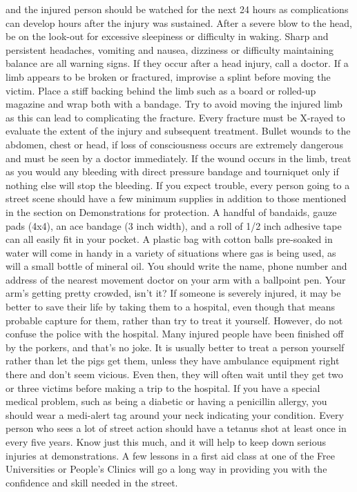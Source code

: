 \documentclass[11pt,twoside,a4paper]{book}
\begin{document}
and the injured person should be watched for the next 24 hours as complications can develop hours after the injury was sustained. After a severe blow to the head, be on the look-out for excessive sleepiness or difficulty in waking. Sharp and persistent headaches, vomiting and nausea, dizziness or difficulty maintaining balance are all warning signs. If they occur after a head injury, call a doctor. If a limb appears to be broken or fractured, improvise a splint before moving the victim. Place a stiff backing behind the limb such as a board or rolled-up magazine and wrap both with a bandage. Try to avoid moving the injured limb as this can lead to complicating the fracture. Every fracture must be X-rayed to evaluate the extent of the injury and subsequent treatment. Bullet wounds to the abdomen, chest or head, if loss of consciousness occurs are extremely dangerous and must be seen by a doctor immediately. If the wound occurs in the limb, treat as you would any bleeding with direct pressure bandage and tourniquet only if nothing else will stop the bleeding. If you expect trouble, every person going to a street scene should have a few minimum supplies in addition to those mentioned in the section on Demonstrations for protection. A handful of bandaids, gauze pads (4x4), an ace bandage (3 inch width), and a roll of 1/2 inch adhesive tape can all easily fit in your pocket. A plastic bag with cotton balls pre-soaked in water will come in handy in a variety of situations where gas is being used, as will a small bottle of mineral oil. You should write the name, phone number and address of the nearest movement doctor on your arm with a ballpoint pen. Your arm's getting pretty crowded, isn't it? If someone is severely injured, it may be better to save their life by taking them to a hospital, even though that means probable capture for them, rather than try to treat it yourself. However, do not confuse the police with the hospital. Many injured people have been finished off by the porkers, and that's no joke. It is usually better to treat a person yourself rather than let the pigs get them, unless they have ambulance equipment right there and don't seem vicious. Even then, they will often wait until they get two or three victims before making a trip to the hospital. If you have a special medical problem, such as being a diabetic or having a penicillin allergy, you should wear a medi-alert tag around your neck indicating your condition. Every person who sees a lot of street action should have a tetanus shot at least once in every five years. Know just this much, and it will help to keep down serious injuries at demonstrations. A few lessons in a first aid class at one of the Free Universities or People's Clinics will go a long way in providing you with the confidence and skill needed in the street.
\end{document}
